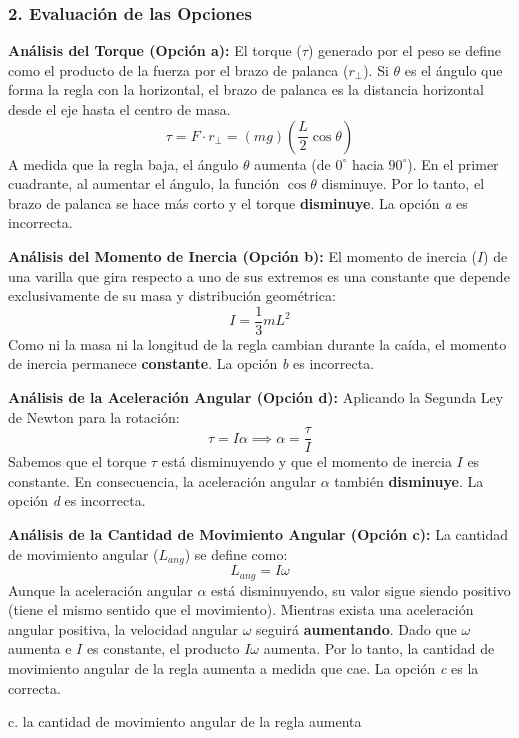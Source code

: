 \documentclass[12pt, a4paper]{article}
\begin{document}
\subsubsection*{2. Evaluación de las Opciones}

\textbf{Análisis del Torque (Opción a):}
El torque ($\tau$) generado por el peso se define como el producto de la fuerza por el brazo de palanca ($r_{\perp}$). Si $\theta$ es el ángulo que forma la regla con la horizontal, el brazo de palanca es la distancia horizontal desde el eje hasta el centro de masa.
$$\tau = F \cdot r_{\perp} = (mg) \left( \frac{L}{2} \cos\theta \right)$$
A medida que la regla baja, el ángulo $\theta$ aumenta (de $0^\circ$ hacia $90^\circ$). En el primer cuadrante, al aumentar el ángulo, la función $\cos\theta$ disminuye. Por lo tanto, el brazo de palanca se hace más corto y el torque \textbf{disminuye}. La opción \textit{a} es incorrecta.

\textbf{Análisis del Momento de Inercia (Opción b):}
El momento de inercia ($I$) de una varilla que gira respecto a uno de sus extremos es una constante que depende exclusivamente de su masa y distribución geométrica:
$$I = \frac{1}{3}mL^2$$
Como ni la masa ni la longitud de la regla cambian durante la caída, el momento de inercia permanece \textbf{constante}. La opción \textit{b} es incorrecta.

\textbf{Análisis de la Aceleración Angular (Opción d):}
Aplicando la Segunda Ley de Newton para la rotación:
$$\tau = I \alpha \implies \alpha = \frac{\tau}{I}$$
Sabemos que el torque $\tau$ está disminuyendo y que el momento de inercia $I$ es constante. En consecuencia, la aceleración angular $\alpha$ también \textbf{disminuye}. La opción \textit{d} es incorrecta.

\textbf{Análisis de la Cantidad de Movimiento Angular (Opción c):}
La cantidad de movimiento angular ($L_{ang}$) se define como:
$$L_{ang} = I \omega$$
Aunque la aceleración angular $\alpha$ está disminuyendo, su valor sigue siendo positivo (tiene el mismo sentido que el movimiento). Mientras exista una aceleración angular positiva, la velocidad angular $\omega$ seguirá \textbf{aumentando}. Dado que $\omega$ aumenta e $I$ es constante, el producto $I \omega$ aumenta. Por lo tanto, la cantidad de movimiento angular de la regla aumenta a medida que cae. La opción \textit{c} es la correcta.

\begin{tcolorbox}[colback=green!5!white, colframe=green!50!black, title=Respuesta Correcta]
\centering \Large c. la cantidad de movimiento angular de la regla aumenta
\end{tcolorbox}
\end{document}
